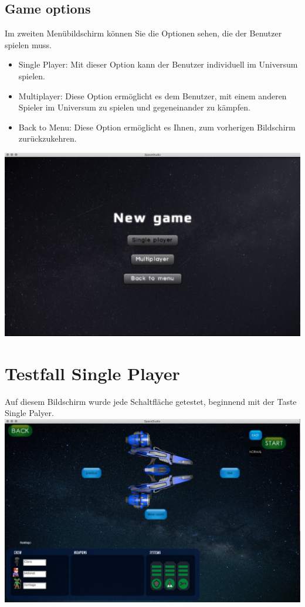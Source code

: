 \documentclass[11pt]{article}
\begin{document}
\subsection{Game options}
Im zweiten Menübildschirm können Sie die Optionen sehen, die der Benutzer spielen muss.
\begin{itemize}
\item Single Player: Mit dieser Option kann der Benutzer individuell im Universum spielen.
\item Multiplayer: Diese Option ermöglicht es dem Benutzer, mit einem anderen Spieler im Universum zu spielen und gegeneinander zu kämpfen.
\item Back to Menu: Diese Option ermöglicht es Ihnen, zum vorherigen Bildschirm zurückzukehren.
\end{itemize}
\includegraphics[scale=0.2]{TestProtocolBilder/menuScreenTwo.png}

\section{Testfall Single Player}
Auf diesem Bildschirm wurde jede Schaltfläche getestet, beginnend mit der Taste Single Palyer.
\includegraphics[scale=0.2]{TestProtocolBilder/selecShipScreen.png}
\end{document}
